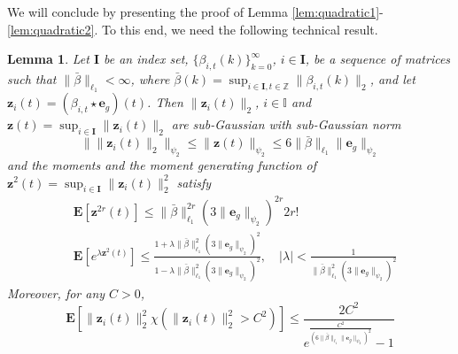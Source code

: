 \documentclass{article}
\def\rvz{{\mathbf{z}}}
\newtheorem{lemma}[theorem]{Lemma}
\newcommand{\e}{\mathbf{e}}
\newcommand{\z}{\mathbf{z}}
\newcommand{\bE}{\mathbf{E}}
\begin{document}
We will conclude by presenting the proof of Lemma \ref{lem:quadratic1}-\ref{lem:quadratic2}. To this end, we need the following technical result. 
  \begin{lemma}
    \label{lem:subGaussian1}
    Let $\mathbf{I}$ be an index set, $\{\beta_{i,t}(k)\}_{k=0}^{\infty}$, $i \in \mathbf{I}$, be a sequence of matrices such that $\|\bar{\beta}\|_{\ell_1}< \infty$, where $\bar{\beta}(k)=\sup_{i \in \mathbf{I},t \in \mathbb{Z}} \|\beta_{i,t}(k)\|_2$, and let $\rvz_{i}(t)=(\beta_{i,t} \star \e_g)(t)$. 
Then $\|\z_i(t)\|_{2}$, $i \in \mathbb{I}$ and 
$\z(t)=\sup_{i \in \mathbf{I}} \|\rvz_i(t)\|_2$ are sub-Gaussian with 
sub-Gaussian norm 
\begin{equation}
\label{lem:subGaussian1:eq0}
    \|\|\z_i(t)\|_2\|_{\psi_2} \le \|\z(t)\|_{\psi_2} \le 6\|\bar{\beta}\|_{\ell_1}\|\e_g\|_{\psi_2}
\end{equation}
and the moments and the moment generating function of $\z^2(t)=\sup_{i \in \mathbf{I}} \|\rvz_i(t)\|_2^2$ satisfy
\begin{align}
   & \bE[\z^{2r}(t)] \le \|\bar{\beta}\|_{\ell_1}^{2r} (3\|\e_g\|_{\psi_2})^{2r} 2r!
      \label{lem:subGaussian1:eq1} \\
   & \bE[e^{\lambda \z^2(t)}] \le \frac{1+\lambda \|\bar{\beta}\|_{\ell_1}^2 (3\|\e_g\|_{\psi_2})^2}{1-\lambda \|\bar{\beta}\|_{\ell_1}^2 (3\|\e_g\|_{\psi_2})^2},  \quad |\lambda| < \frac{1}{\|\bar{\beta}\|_{\ell_1}^2 (3\|\e_g\|_{\psi_2})^2}
   \label{lem:subGaussian1:eq2}
\end{align}
Moreover, for any $C > 0$,
\begin{equation}
\label{lem:subGaussian1:eq4}
   \bE[\|\z_i(t)\|_2^2 \chi(\|\z_i(t)\|_2^2 > C^2)] \le 
   \frac{2C^2}{e^{\frac{C^2}{(6\|\bar{\beta}\|_{\ell_1} \|\e_g\|_{\psi_2})^2}}-1}
\end{equation}
\end{lemma}
\end{document}
